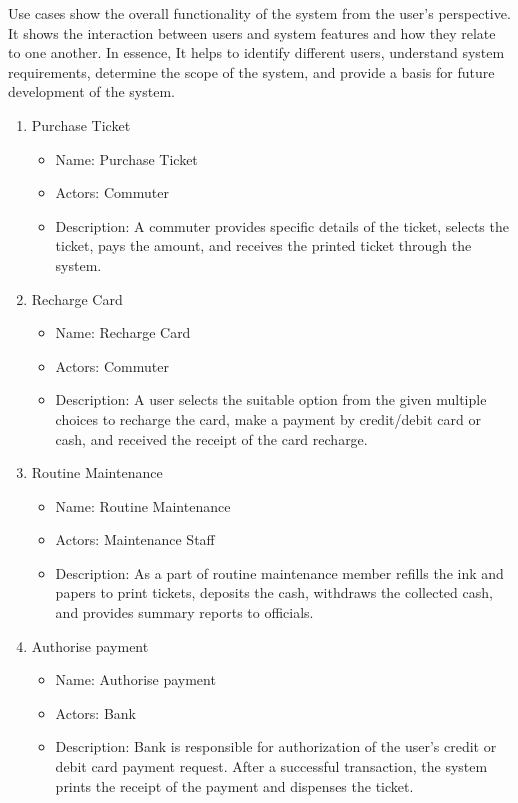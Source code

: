 \documentclass[a4paper,12pt]{report}
\begin{document}
Use cases show the overall functionality of the system from the user’s perspective. It shows the interaction between users and system features and how they relate to one another. In essence, It helps to identify different users, understand system requirements, determine the scope of the system, and provide a basis for future development of the system.\\
\begin{enumerate}
    \item Purchase Ticket
        \begin{itemize}
            \item Name: Purchase Ticket
            \item Actors: Commuter
            \item Description: A commuter provides specific details of the ticket, selects the ticket, pays the amount, and receives the printed ticket through the system.
        \end{itemize}
        \item Recharge Card
        \begin{itemize}
            \item Name: Recharge Card
            \item Actors: Commuter
            \item Description: A user selects the suitable option from the given multiple choices to recharge the card, make a payment by credit/debit card or cash, and received the receipt of the card recharge.
        \end{itemize}
        \item Routine Maintenance
        \begin{itemize}
            \item Name: Routine Maintenance
            \item Actors: Maintenance Staff 
            \item Description: As a part of routine maintenance member refills the ink and papers to print tickets, deposits the cash, withdraws the collected cash, and provides summary reports to officials.
        \end{itemize}
        
        \item Authorise payment
        \begin{itemize}
            \item Name: Authorise payment
            \item Actors: Bank
            \item Description: Bank is responsible for authorization of the user’s credit or debit card payment request. After a successful transaction, the system prints the receipt of the payment and dispenses the ticket.
        \end{itemize}
        

\end{enumerate}
\end{document}
